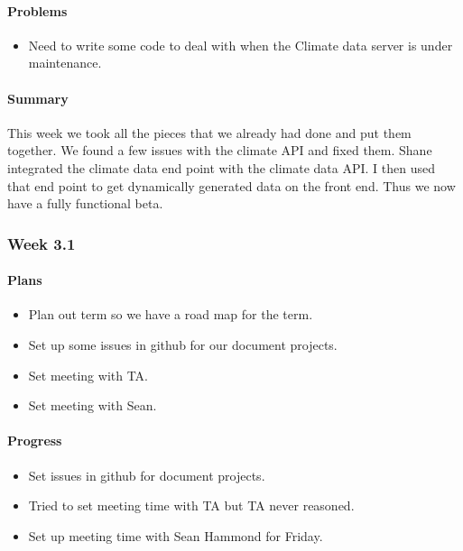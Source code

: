 \documentclass[onecolumn, draftclsnofoot,10pt, compsoc]{article}
\begin{document}
			\paragraph{Problems} \hfill \break
				\begin{itemize}
					\item Need to write some code to deal with when the Climate data server is under maintenance.
				\end{itemize}
			\paragraph{Summary} \hfill \break
			This week we took all the pieces that we already had done and put them together. We found a few issues with the climate API and fixed them. Shane integrated the climate data end point with the climate data API. I then used that end point to get dynamically generated data on the front end. Thus we now have a fully functional beta.\\

		\subsubsection{Week 3.1}
		    \paragraph{Plans} \hfill \break
		        \begin{itemize}
		            \item Plan out term so we have a road map for the term.\\
		            \item Set up some issues in github for our document projects.\\
		            \item Set meeting with TA.\\
		            \item Set meeting with Sean.\\
		        \end{itemize}
		    \paragraph{Progress} \hfill \break
		        \begin{itemize}
		            \item Set issues in github for document projects.
		            \item Tried to set meeting time with TA but TA never reasoned.\\
		            \item Set up meeting time with Sean Hammond for Friday.\\
		        \end{itemize}
\end{document}
